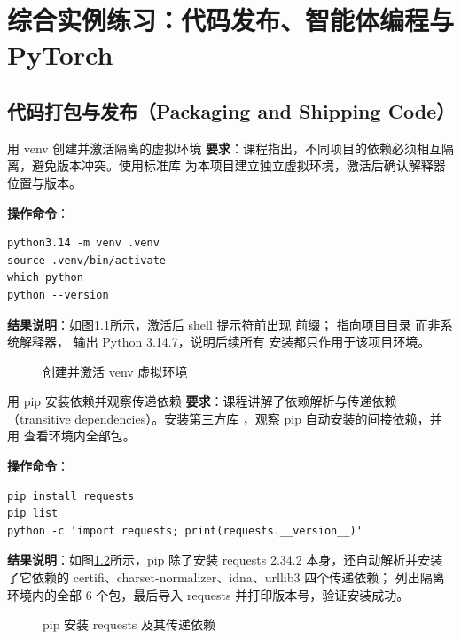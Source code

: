\chapter{综合实例练习：代码发布、智能体编程与 PyTorch}
\label{cp:ms2-practice}

\section{代码打包与发布（Packaging and Shipping Code）}

\begin{exercise}{用 venv 创建并激活隔离的虚拟环境}
\textbf{要求}：课程指出，不同项目的依赖必须相互隔离，避免版本冲突。使用标准库  为本项目建立独立虚拟环境，激活后确认解释器位置与版本。

\textbf{操作命令}：
\begin{lstlisting}
python3.14 -m venv .venv
source .venv/bin/activate
which python
python --version
\end{lstlisting}

\textbf{结果说明}：如图\ref{fig:ms2-01}所示，激活后 shell 提示符前出现  前缀； 指向项目目录  而非系统解释器， 输出 Python 3.14.7，说明后续所有  安装都只作用于该项目环境。

\begin{figure}[H]
    \centering
    \caption{创建并激活 venv 虚拟环境}
    \label{fig:ms2-01}
\end{figure}
\end{exercise}

\begin{exercise}{用 pip 安装依赖并观察传递依赖}
\textbf{要求}：课程讲解了依赖解析与传递依赖（transitive dependencies）。安装第三方库 ，观察 pip 自动安装的间接依赖，并用  查看环境内全部包。

\textbf{操作命令}：
\begin{lstlisting}
pip install requests
pip list
python -c 'import requests; print(requests.__version__)'
\end{lstlisting}

\textbf{结果说明}：如图\ref{fig:ms2-02}所示，pip 除了安装 requests 2.34.2 本身，还自动解析并安装了它依赖的 certifi、charset-normalizer、idna、urllib3 四个传递依赖； 列出隔离环境内的全部 6 个包，最后导入 requests 并打印版本号，验证安装成功。

\begin{figure}[H]
    \centering
    \caption{pip 安装 requests 及其传递依赖}
    \label{fig:ms2-02}
\end{figure}
\end{exercise}

